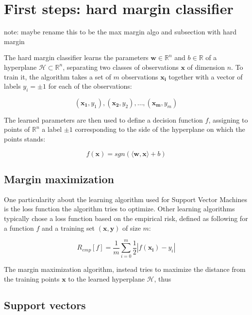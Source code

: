 
\section {First steps: hard margin classifier}

note: maybe rename this to be the max margin algo and subsection with hard margin

The hard margin classifier learns the parameters $\mathbf{w} \in \mathbb{R}^n$ and $b \in \mathbb{R}$ of a hyperplane $\mathscr{H} \subset \mathbb{R}^n$, separating two classes of observations $\mathbf{x}$ of dimension $n$. To train it, the algorithm takes a set of $m$ observations $\mathbf{x_i}$ together with a vector of labels $y_i = \pm 1$ for each of the observations:

$$
(\mathbf{x_1}, y_1), (\mathbf{x_2}, y_2), \dotsc, (\mathbf{x_m}, y_m)
$$

The learned parameters are then used to define a decision function $f$, assigning to points of $\mathbb{R}^n$ a label $\pm 1$ corresponding to the side of the hyperplane on which the points stands:

\begin{equation}
  f(\mathbf{x}) = sgn(\langle\mathbf{w}, \mathbf{x}\rangle + b)
\end{equation}

\subsection {Margin maximization}

One particularity about the learning algorithm used for Support Vector Machines is the loss function the algorithm tries to optimize. Other learning algorithms typically chose a loss function based on the empirical risk, defined as following for a function $f$ and a training set $(\mathbf{x}, \mathbf{y})$ of size $m$:

$$R_{emp}[f] = \frac{1}{m}\sum^m_{i=0}\frac{1}{2}|f(\mathbf{x_i}) - y_i|$$

The margin maximization algorithm, instead tries to maximize the distance from the training points $\mathbf{x}$ to the learned hyperplane $\mathscr{H}$, thus 

\subsection {Support vectors}
